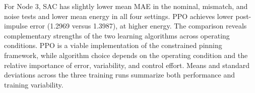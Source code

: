 For Node 3, SAC has slightly lower mean MAE in the nominal, mismatch, and noise tests and lower mean energy in all four settings. PPO achieves lower post-impulse error (1.2969 versus 1.3987), at higher energy. The comparison reveals complementary strengths of the two learning algorithms across operating conditions. PPO is a viable implementation of the constrained pinning framework, while algorithm choice depends on the operating condition and the relative importance of error, variability, and control effort. Means and standard deviations across the three training runs summarize both performance and training variability.
